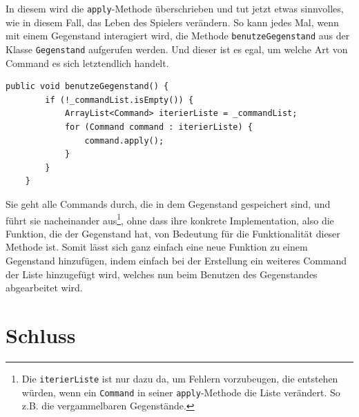 \documentclass[12pt,twoside]{article}
\theoremstyle{plain}
\theoremstyle{definition}
\theoremstyle{remark}
\begin{document}
In diesem wird die \texttt{apply}-Methode überschrieben und tut jetzt etwas sinnvolles, wie in diesem Fall, das Leben des Spielers verändern.
So kann jedes Mal, wenn mit einem Gegenstand interagiert wird, die Methode \texttt{benutzeGegenstand} aus der Klasse \texttt{Gegenstand} aufgerufen werden.
Und dieser ist es egal, um welche Art von Command es sich letztendlich handelt.
\begin{lstlisting}[caption=die benutzeGegenstand-Methode aus der Klasse Gegenstand, label=code:main_gegenstand]
	public void benutzeGegenstand() {
		if (!_commandList.isEmpty()) {
			ArrayList<Command> iterierListe = _commandList;
			for (Command command : iterierListe) {
				command.apply();
			}
		}
	}
\end{lstlisting}
Sie geht alle Commands durch, die in dem Gegenstand gespeichert sind, und führt sie nacheinander aus\footnote{Die \texttt{iterierListe} ist nur dazu da, um Fehlern vorzubeugen, die entstehen würden, wenn ein \texttt{Command} in seiner \texttt{apply}-Methode die Liste verändert. So z.B. die vergammelbaren Gegenstände.}, ohne dass ihre konkrete Implementation, also die Funktion, die der Gegenstand hat, von Bedeutung für die Funktionalität dieser Methode ist. Somit lässt sich ganz einfach eine neue Funktion zu einem Gegenstand hinzufügen, indem einfach bei der Erstellung ein weiteres Command der Liste hinzugefügt wird, welches nun beim Benutzen des Gegenstandes abgearbeitet wird.

\section{Schluss}
\label{sec:end}
\end{document}
